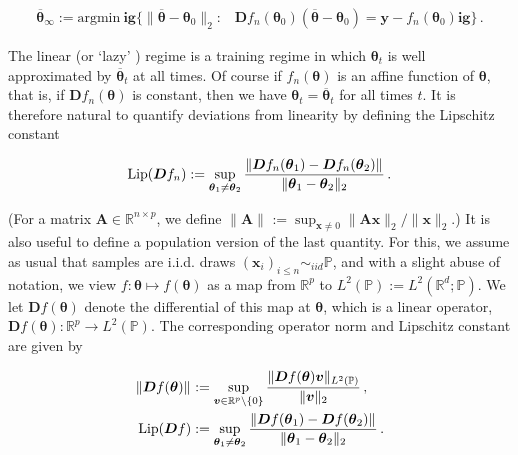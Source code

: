\begin{align}
  \overline{\boldsymbol \theta}_{\infty}:= \underset{}{\mathrm{argmin}} \ \mathbf{ig}\{\|\overline{\boldsymbol \theta}-{\boldsymbol \theta}_0\|_2:\;\;\;
  {\boldsymbol D} f_n ({\boldsymbol \theta}_0) (\overline{\boldsymbol \theta}-{\boldsymbol \theta}_0) = {\boldsymbol y}-f_n({\boldsymbol \theta}_0)\mathbf{ig}\}\, . \label{eq:MinNormTheta}
\end{align}

The linear (or `lazy' ) regime is a training regime in which ${\boldsymbol \theta}_t$ is well approximated by $\overline{\boldsymbol \theta}_t$ at all times. Of course if $f_n({\boldsymbol \theta})$ is an affine function of ${\boldsymbol \theta}$, that is, if ${\boldsymbol D} f_n({\boldsymbol \theta})$ is constant, then we have ${\boldsymbol \theta}_t=\overline{\boldsymbol \theta}_t$ for all times $t$. It is therefore natural to quantify deviations from linearity by defining  the Lipschitz constant

\begin{align}

  {\rm Lip}({\boldsymbol D} f_n) := \sup_{{\boldsymbol \theta}_1\neq{\boldsymbol \theta}_2}\frac{\|{\boldsymbol D} f_n({\boldsymbol \theta}_1)-{\boldsymbol D} f_n({\boldsymbol \theta}_2)\|_{}}{\|{\boldsymbol \theta}_1-{\boldsymbol \theta}_2\|_2}\, .

\end{align}

(For a matrix ${\boldsymbol A}\in {\mathbb R}^{n\times p}$, we define
$\|{\boldsymbol A}\|_{}:=\sup_{{\boldsymbol x}\neq 0}\|{\boldsymbol A}{\boldsymbol x}\|_2/\|{\boldsymbol x}\|_2$.)
It is also useful to define a population version of the last quantity. For this, we assume as usual that samples are i.i.d. draws
$({\boldsymbol x}_i)_{i\le n}\sim_{iid} \mathbb{P}$,
and with a slight abuse of notation, we view $f:{\boldsymbol \theta}\mapsto f({\boldsymbol \theta})$ as a map from ${\mathbb R}^p$ to
$L^2(\mathbb{P}):=L^2({\mathbb R}^d;\mathbb{P})$.
We let ${\boldsymbol D} f({\boldsymbol \theta})$ denote the differential of this map at ${\boldsymbol \theta}$,
which is a linear operator, ${\boldsymbol D} f({\boldsymbol \theta}):{\mathbb R}^p\to
L^2(\mathbb{P})$. The corresponding operator norm and Lipschitz constant are given by

\begin{align}
  \|{\boldsymbol D} f({\boldsymbol \theta})\|_{}& :=
  \sup_{{\boldsymbol v}\in{\mathbb R}^p\setminus\{0\}}\frac{\|{\boldsymbol D}
  f({\boldsymbol \theta})
  {\boldsymbol v}\|_{L^2(\mathbb{P})}}{\|{\boldsymbol v}\|_2}\, ,\\
  {\rm Lip}({\boldsymbol D} f) &:= \sup_{{\boldsymbol \theta}_1\neq{\boldsymbol \theta}_2}\frac{\|{\boldsymbol D} f({\boldsymbol \theta}_1) -{\boldsymbol D} f({\boldsymbol \theta}_2)\|_{}}{\|{\boldsymbol \theta}_1-{\boldsymbol \theta}_2\|_2}\, .
\end{align}

